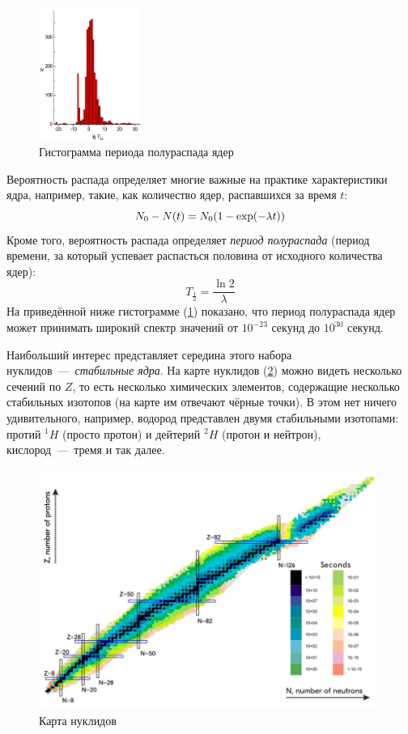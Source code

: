 \documentclass[titlepage]{article}
\begin{document}
\begin{figure}
\centering
\includegraphics[width=0.3\textwidth]{2.jpg}
\caption{\label{2}Гистограмма периода полураспада ядер}
\end{figure}

\par
Вероятность распада определяет многие важные на практике характеристики ядра, например, такие, как количество ядер, распавшихся за время $t$:
\begin{equation}
 N_0 - N\qty(t) = N_0\qty(1-\exp(-\lambda t))
\end{equation}
Кроме того, вероятность распада определяет \emph{период полураспада} (период времени, за который успевает распасться половина от исходного количества ядер):
\begin{equation}
 T_{\tfrac{1}{2}} =  \dfrac{\ln{2}}{\lambda}
\end{equation}
На приведённой ниже гистограмме (\ref{2}) показано, что период полураспада ядер может принимать широкий спектр значений от $10^{-23}$ секунд до $10^{30}$ секунд.

\par
Наибольший интерес представляет середина этого набора нуклидов~\----~\emph{стабильные ядра}. На карте нуклидов (\ref{3}) можно видеть несколько сечений по $Z$, то есть несколько химических элементов, содержащие несколько стабильных изотопов (на карте им отвечают чёрные точки). В этом нет ничего удивительного, например, водород представлен двумя стабильными изотопами: протий ${}^1 H$ (просто протон) и дейтерий ${}^2 H$ (протон и нейтрон), кислород~\----~тремя и так далее.

\begin{figure}[htb]
 \centering
 \includegraphics[width=110mm]{3.jpg}
 \caption{Карта нуклидов}
 \label{3}
\end{figure}
\end{document}

